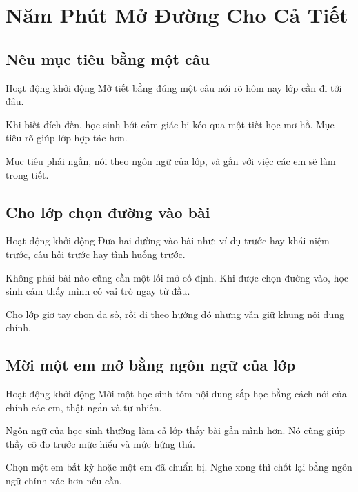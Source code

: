 \chapter{Năm Phút Mở Đường Cho Cả Tiết}

\section{Nêu mục tiêu bằng một câu}
\begin{khoidongbox}{Hoạt động khởi động}
Mở tiết bằng đúng một câu nói rõ hôm nay lớp cần đi tới đâu.
\end{khoidongbox}
\begin{visaohieuqua}
Khi biết đích đến, học sinh bớt cảm giác bị kéo qua một tiết học mơ hồ. Mục tiêu rõ giúp lớp hợp tác hơn.
\end{visaohieuqua}
\begin{cachlam5phut}
Mục tiêu phải ngắn, nói theo ngôn ngữ của lớp, và gắn với việc các em sẽ làm trong tiết.
\end{cachlam5phut}
\ngancach

\section{Cho lớp chọn đường vào bài}
\begin{khoidongbox}{Hoạt động khởi động}
Đưa hai đường vào bài như: ví dụ trước hay khái niệm trước, câu hỏi trước hay tình huống trước.
\end{khoidongbox}
\begin{visaohieuqua}
Không phải bài nào cũng cần một lối mở cố định. Khi được chọn đường vào, học sinh cảm thấy mình có vai trò ngay từ đầu.
\end{visaohieuqua}
\begin{cachlam5phut}
Cho lớp giơ tay chọn đa số, rồi đi theo hướng đó nhưng vẫn giữ khung nội dung chính.
\end{cachlam5phut}
\ngancach

\section{Mời một em mở bằng ngôn ngữ của lớp}
\begin{khoidongbox}{Hoạt động khởi động}
Mời một học sinh tóm nội dung sắp học bằng cách nói của chính các em, thật ngắn và tự nhiên.
\end{khoidongbox}
\begin{visaohieuqua}
Ngôn ngữ của học sinh thường làm cả lớp thấy bài gần mình hơn. Nó cũng giúp thầy cô đo trước mức hiểu và mức hứng thú.
\end{visaohieuqua}
\begin{cachlam5phut}
Chọn một em bất kỳ hoặc một em đã chuẩn bị. Nghe xong thì chốt lại bằng ngôn ngữ chính xác hơn nếu cần.
\end{cachlam5phut}
\ngancach


